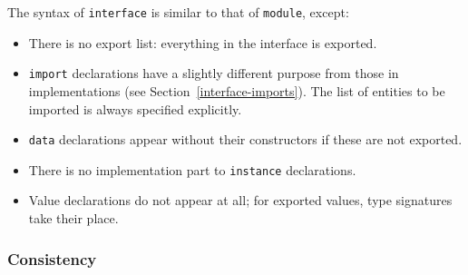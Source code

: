 The syntax of \mbox{\tt interface} is similar to that of \mbox{\tt module}, except:
\begin{itemize}
\item
There is no export list: everything in the interface is exported.
\item
\mbox{\tt import} declarations have a
slightly different purpose from those
in implementations (see Section~\ref{interface-imports}).
The list of entities to be imported is always specified explicitly.
\item
\mbox{\tt data} declarations appear without their constructors if these
are not exported.
\item
There is no implementation part to \mbox{\tt instance} declarations.
\item
Value declarations do not appear at all; for exported values, type signatures
take their place.
\end{itemize}


%
%

\subsubsection{Consistency}
\label{consistency}

